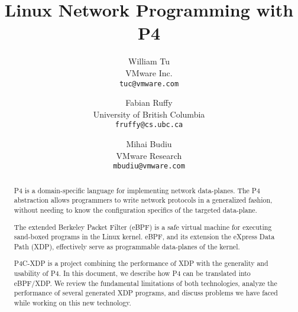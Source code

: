 \documentclass[9pt,twocolumn,times]{article}
\title{Linux Network Programming with P4}
\author{William Tu\\
  VMware Inc.\\
  \texttt{tuc@vmware.com}
  \and
  Fabian Ruffy\\
  University of British Columbia\\
  \texttt{fruffy@cs.ubc.ca}
  \and
  Mihai Budiu\\
  VMware Research\\
  \texttt{mbudiu@vmware.com}
}
\date{}
\begin{document}
\maketitle

\begin{abstract}
  P4 is a domain-specific language for implementing network data-planes.
  The P4 abstraction allows programmers to write network protocols in a 
  generalized fashion, without needing to know the configuration specifics
  of the targeted data-plane.
  
  The extended Berkeley Packet Filter (eBPF) is a safe virtual machine for 
  executing sand-boxed programs in the Linux kernel. eBPF, and its extension 
  the eXpress Data Path (XDP), effectively serve as programmable data-planes of 
  the kernel.

  P4C-XDP is a project combining the performance of XDP with the generality and 
  usability of P4. In this document, we describe how P4 can be 
  translated into eBPF/XDP. We review the fundamental limitations of both 
  technologies, analyze the performance of several generated XDP programs, and 
  discuss problems we have faced while working on this new technology.
  
\end{abstract}











\end{document}
